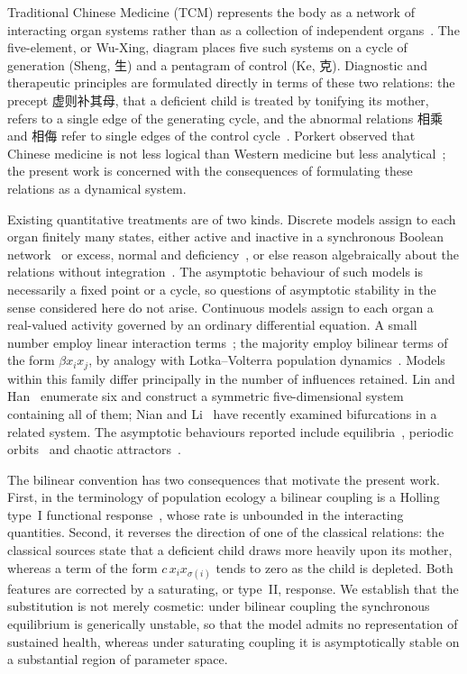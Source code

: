 \documentclass[11pt]{article}
\theoremstyle{definition}
\theoremstyle{remark}
\begin{document}
	Traditional Chinese Medicine (TCM) represents the body as a network of interacting
	organ systems rather than as a collection of independent
	organs~\cite{Kaptchuk2000,Tang2008}. The five-element, or Wu-Xing, diagram places
	five such systems on a cycle of generation (Sheng, 生) and a pentagram of
	control (Ke, 克). Diagnostic and therapeutic principles are formulated directly
	in terms of these two relations: the precept 虚则补其母, that a deficient child
	is treated by tonifying its mother, refers to a single edge of the generating cycle,
	and the abnormal relations 相乘 and 相侮 refer to single edges of the
	control cycle~\cite{NeiJing}. Porkert observed that Chinese medicine is not less
	logical than Western medicine but less analytical~\cite{Porkert1990}; the present
	work is concerned with the consequences of formulating these relations as a
	dynamical system.
	
	Existing quantitative treatments are of two kinds. Discrete models assign to each
	organ finitely many states, either active and inactive in a synchronous Boolean
	network~\cite{Bellavite1998} or excess, normal and deficiency~\cite{Chen2002}, or
	else reason algebraically about the relations without
	integration~\cite{MengYinYang,Zhang2011,Kim2014,Feng2003}. The asymptotic behaviour
	of such models is necessarily a fixed point or a cycle, so questions of asymptotic
	stability in the sense considered here do not arise. Continuous models assign to each
	organ a real-valued activity governed by an ordinary differential equation. A small
	number employ linear interaction terms~\cite{ChenZhang2008,Zhao2006}; the majority
	employ bilinear terms of the form $\beta x_i x_j$, by analogy with Lotka--Volterra
	population dynamics~\cite{Wang2008,Ding2008,Chen2008,Yu2005,Jiang2006,Li1987,
		Zhang1998,Murray2002}. Models within this family differ principally in the number of
	influences retained. Lin and Han~\cite{Lin2020} enumerate six and construct a
	symmetric five-dimensional system containing all of them; Nian and Li~\cite{Nian2025}
	have recently examined bifurcations in a related system. The asymptotic behaviours
	reported include equilibria~\cite{Wang2008,Ding2008,Chen2008,Yu2005}, periodic
	orbits~\cite{Jiang2006,Li1987,Zhang1998} and chaotic
	attractors~\cite{Jiang2006,Li1987}.
	
	The bilinear convention has two consequences that motivate the present work. First,
	in the terminology of population ecology a bilinear coupling is a Holling type~I
	functional response~\cite{Holling1959}, whose rate is unbounded in the interacting
	quantities. Second, it reverses the direction of one of the classical relations: the
	classical sources state that a deficient child draws more heavily upon its mother,
	whereas a term of the form $c\,x_i x_{\sigma(i)}$ tends to zero as the child is
	depleted. Both features are corrected by a saturating, or type~II, response. We
	establish that the substitution is not merely cosmetic: under bilinear coupling the
	synchronous equilibrium is generically unstable, so that the model admits no
	representation of sustained health, whereas under saturating coupling it is
	asymptotically stable on a substantial region of parameter space.
	
\end{document}
